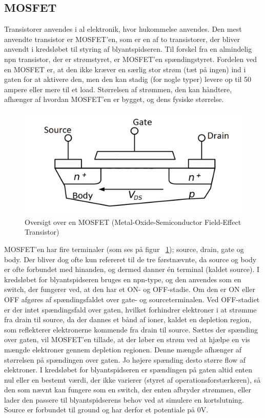 \subsection{MOSFET}

Transistorer anvendes i al elektronik, hvor hukommelse anvendes. Den mest anvendte transistor er MOSFET’en, som er en af to transistorer, der bliver anvendt i kredsløbet til styring af blyantspidseren. 
Til forskel fra en almindelig npn transistor, der er strømstyret, er MOSFET’en spændingstyret. Fordelen ved en MOSFET er, at den ikke kræver en særlig stor strøm (tæt på ingen) ind i gaten for at aktivere den, men den kan stadig (for nogle typer) levere op til 50 ampere eller mere til et load. Størrelsen af strømmen, den kan håndtere, afhænger af hvordan MOSFET’en er bygget, og dens fysiske størrelse.

\begin{figure}[h]
	\begin{center}
	\includegraphics[scale=0.15]{Billeder/MOSFET.png}
	\caption[caption]{Oversigt over en MOSFET (Metal-Oxide-Semiconductor Field-Effect Transistor)\label{fig:MOSFET}\\\hspace{\textwidth}}
	\end{center}
\end{figure}
 
MOSFET’en har fire terminaler (som ses på figur ~\ref{fig:MOSFET}); source, drain, gate og body. Der bliver dog ofte kun refereret til de tre førstnævnte, da source og body er ofte forbundet med hinanden, og dermed danner én terminal (kaldet source). I kredsløbet for blyantspidseren bruges en npn-type, og den anvendes som en switch, der fungerer ved, at den har et ON- og OFF-stadie. Om den er ON eller OFF afgøres af spændingsfaldet over gate- og sourceterminalen. Ved OFF-stadiet er der intet spændingsfald over gaten, hvilket forhindrer elektroner i at strømme fra drain til source, da der dannes et bånd af ioner, kaldet en depletion region, som reflekterer elektronerne kommende fra drain til source. Sættes der spænding over gaten, vil MOSFET’en tillade, at der løber en strøm ved at hjælpe en vis mængde elektroner gennem depletion regionen. Denne mængde afhænger af størrelsen på spændingen over gaten. Jo højere spænding desto større flow af elektroner. I kredsløbet for blyantspidseren er spændingen på gaten altid enten nul eller en bestemt værdi, der ikke varierer (styret af operationsforstærkeren), så den som nævnt kan fungere som en switch, der enten afbryder strømmen, eller lader den passere til blyantspidserens behov ved at simulere en kortslutning. Source er forbundet til ground og har derfor et potentiale på 0V.

